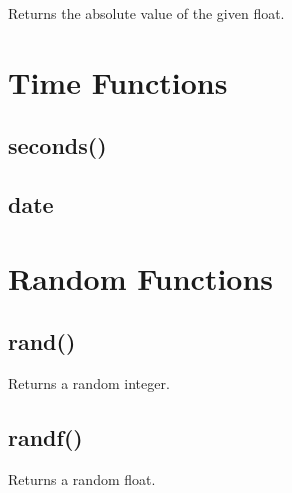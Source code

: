 Returns the absolute value of the given float.\hypertarget{Available_Native_Calls_Page_Time_ANC_Section}{}\section{Time Functions}\label{Available_Native_Calls_Page_Time_ANC_Section}
\hypertarget{Available_Native_Calls_Page_Seconds_Desc}{}\subsection{seconds()}\label{Available_Native_Calls_Page_Seconds_Desc}
\hypertarget{Available_Native_Calls_Page_Date_Desc}{}\subsection{date}\label{Available_Native_Calls_Page_Date_Desc}
\hypertarget{Available_Native_Calls_Page_Rand_ANC_Section}{}\section{Random Functions}\label{Available_Native_Calls_Page_Rand_ANC_Section}
\hypertarget{Available_Native_Calls_Page_Rand_Desc}{}\subsection{rand()}\label{Available_Native_Calls_Page_Rand_Desc}
Returns a random integer.\hypertarget{Available_Native_Calls_Page_Randf_Desc}{}\subsection{randf()}\label{Available_Native_Calls_Page_Randf_Desc}
Returns a random float. 